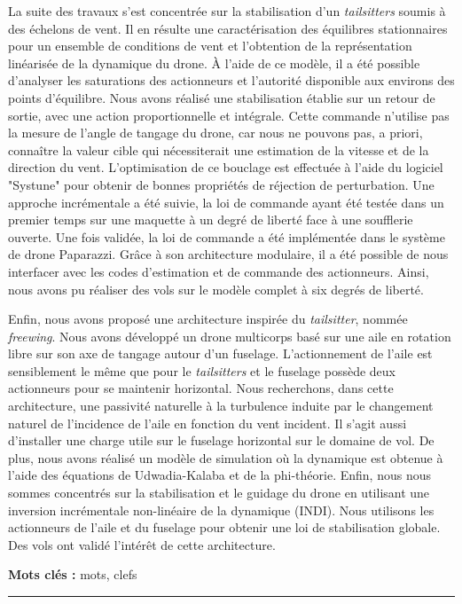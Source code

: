 \begin{vcenterpage}
La suite des travaux s'est concentrée sur la stabilisation d'un \textit{tailsitters} soumis à des échelons de vent. Il en résulte une caractérisation des équilibres stationnaires pour un ensemble de conditions de vent et l'obtention de la représentation linéarisée de la dynamique du drone. À l'aide de ce modèle, il a été possible d'analyser les saturations des actionneurs et l'autorité disponible aux environs des points d'équilibre. Nous avons réalisé une stabilisation établie sur un retour de sortie, avec une action proportionnelle et intégrale. Cette commande n'utilise pas la mesure de l'angle de tangage du drone, car nous ne pouvons pas, a priori, connaître la valeur cible qui nécessiterait une estimation de la vitesse et de la direction du vent. L'optimisation de ce bouclage est effectuée à l'aide du logiciel "Systune" pour obtenir de bonnes propriétés de réjection de perturbation. Une approche incrémentale a été suivie, la loi de commande ayant été testée dans un premier temps sur une maquette à un degré de liberté face à une soufflerie ouverte. Une fois validée, la loi de commande a été implémentée dans le système de drone Paparazzi. Grâce à son architecture modulaire, il a été possible de nous interfacer avec les codes d'estimation et de commande des actionneurs. Ainsi, nous avons pu réaliser des vols sur le modèle complet à six degrés de liberté.

Enfin, nous avons proposé une architecture inspirée du \textit{tailsitter}, nommée \textit{freewing}. Nous avons développé un drone multicorps basé sur une aile en rotation libre sur son axe de tangage autour d'un fuselage. L'actionnement de l'aile est sensiblement le même que pour le \textit{tailsitters} et le fuselage possède deux actionneurs pour se maintenir horizontal. Nous recherchons, dans cette architecture, une passivité naturelle à la turbulence induite par le changement naturel de l'incidence de l'aile en fonction du vent incident. Il s'agit aussi d'installer une charge utile sur le fuselage horizontal sur le domaine de vol. De plus, nous avons réalisé un modèle de simulation où la dynamique est obtenue à l'aide des équations de Udwadia-Kalaba et de la phi-théorie. Enfin, nous nous sommes concentrés sur la stabilisation et le guidage du drone en utilisant une inversion incrémentale non-linéaire de la dynamique (INDI). Nous utilisons les actionneurs de l'aile et du fuselage pour obtenir une loi de stabilisation globale. Des vols ont validé l'intérêt de cette architecture.

{\large\textbf{Mots clés :}}
mots, clefs

\noindent\rule[2pt]{\textwidth}{0.5pt}
\end{vcenterpage}


